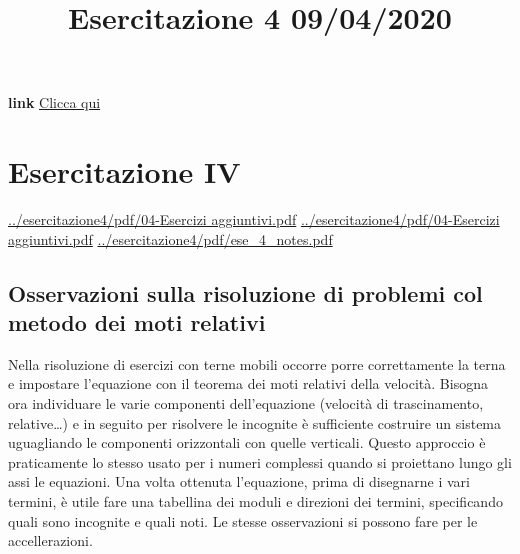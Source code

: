 \title{Esercitazione 4 09/04/2020}\newline
\textbf{link} \href{https://web.microsoftstream.com/video/d71ffb36-a843-491f-a33d-da4a7d0b0af9}{Clicca qui}
\section{Esercitazione IV}
\url{../esercitazione4/pdf/04-Esercizi aggiuntivi.pdf}\newline
\url{../esercitazione4/pdf/04-Esercizi aggiuntivi.pdf}\newline
\url{../esercitazione4/pdf/ese_4_notes.pdf}
\subsection{Osservazioni sulla risoluzione di problemi col metodo dei moti relativi}
Nella risoluzione di esercizi con terne mobili occorre porre correttamente la terna e impostare l'equazione con il teorema dei moti relativi della velocità. Bisogna ora individuare le varie componenti dell'equazione (velocità di trascinamento, relative\dots) e in seguito per risolvere le incognite è sufficiente costruire un sistema uguagliando le componenti orizzontali con quelle verticali. Questo approccio è praticamente lo stesso usato per i numeri complessi quando si proiettano lungo gli assi le equazioni.\newline
Una volta ottenuta l'equazione, prima di disegnarne i vari termini, è utile fare una tabellina dei moduli e direzioni dei termini, specificando quali sono incognite e quali noti.\newline
Le stesse osservazioni si possono fare per le accellerazioni.